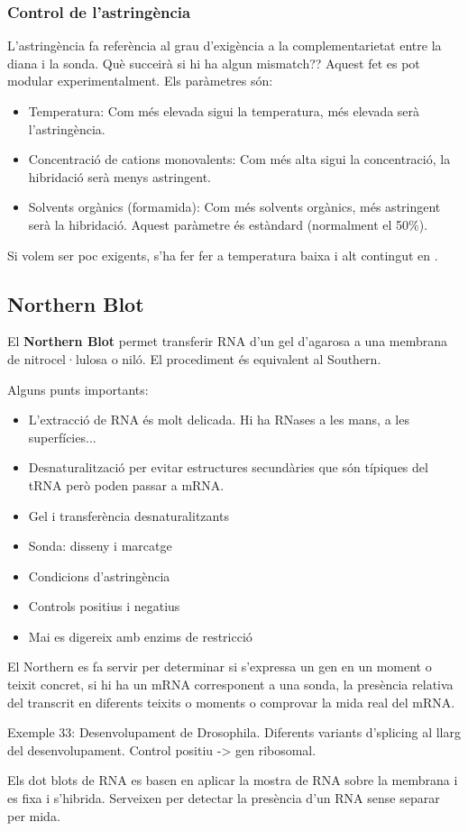 \subsubsection{Control de l'astringència}
\label{sec:contr-de-lastr}
L'astringència fa referència al grau d'exigència a la
complementarietat entre la diana i la sonda. Què succeirà si hi ha
algun mismatch?? Aquest fet es pot modular experimentalment. Els
paràmetres són:
\begin{itemize}
\item Temperatura: Com més elevada sigui la temperatura, més elevada
  serà l'astringència.

\item Concentració de cations monovalents: Com més alta sigui la
  concentració, la hibridació serà menys astringent. 

\item Solvents orgànics (formamida): Com més solvents orgànics, més astringent
  serà la hibridació. Aquest paràmetre és estàndard (normalment el 50\%).
\end{itemize}

Si volem ser poc exigents, s'ha fer fer a temperatura baixa i alt
contingut en .


\subsection{Northern Blot}
\label{sec:northern-blot-1}
El \textbf{Northern Blot} permet transferir RNA d'un gel d'agarosa a
una membrana de nitrocel·lulosa o niló. El procediment és equivalent
al Southern.

Alguns punts importants:
\begin{itemize}
\item L'extracció de RNA és molt delicada. Hi ha RNases a les mans, a
  les superfícies...
\item Desnaturalització per evitar estructures secundàries que són
  típiques del tRNA però poden passar a mRNA.
\item Gel i transferència desnaturalitzants
\item Sonda: disseny i marcatge
\item Condicions d'astringència
\item Controls positius i negatius
\item Mai es digereix amb enzims de restricció
\end{itemize}

El Northern es fa servir per determinar si s'expressa un gen en un
moment o teixit concret, si hi ha un mRNA corresponent a una sonda, la
presència relativa del transcrit en diferents teixits o moments o
comprovar la mida real del mRNA.

Exemple 33: Desenvolupament de Drosophila. Diferents variants
d'splicing al llarg del desenvolupament. Control positiu -> gen
ribosomal.

Els dot blots de RNA es basen en aplicar la mostra de RNA sobre la
membrana i es fixa i s'hibrida. Serveixen per detectar la presència
d'un RNA sense separar per mida.